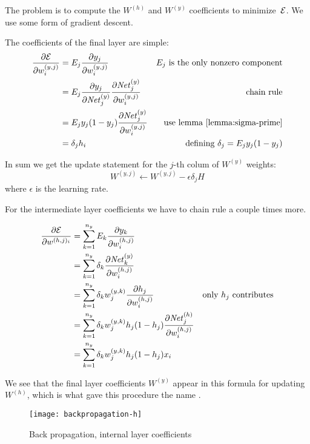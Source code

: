 The problem is to compute the $W^{(h)}$ and $W^{(y)}$ coefficients to
minimize~${\cal E}$. We use some form of gradient descent.

The coefficients of the final layer are simple:
\begin{align}
  \frac{\partial{\cal E}}{\partial w^{(y,j)}_i}
  &=E_j\frac{\partial y_j}{\partial w^{(y,j)}_i}
  &\hbox{$E_j$ is the only nonzero component}\\
  &=E_j \frac{\partial y_j}{\partial \mathord{\mathit{Net}}^{(y)}_j}
  \frac{\partial \mathord{\mathit{Net}}^{(y)}_j}{\partial w^{(y,j)}_i}
  &\hbox{chain rule}\\
  &=E_j y_j(1-y_j)
  \frac{\partial \mathord{\mathit{Net}}^{(y)}_j}{\partial w^{(y,j)}_i}
  &\hbox{use lemma~\ref{lemma:sigma-prime}}\\
  &=\delta_j h_i
  &\hbox{defining $\delta_j=E_jy_j(1-y_j)$}\\
\end{align}

In sum we get the update statement for the $j$-th colum of $W^{(y)}$
weights:
\[ W^{(y,j)} \leftarrow W^{(y,j)} - \epsilon \delta_j H \]
where $\epsilon$ is the learning rate.

For the intermediate layer coefficients we have to chain rule a couple
times more.

\begin{align}
  \frac{\partial{\cal E}}{\partial w^{(h,j)_i}}
  &=\sum_{k=1}^{n_y} E_k\frac{\partial y_k}{\partial w^{(h,j)}_i}\\
  &=\sum_{k=1}^{n_y} \delta_k\frac{\partial \mathord{\mathit{Net}}^{(y)}_k}{\partial w^{(h,j)}_i}\\
  &=\sum_{k=1}^{n_y} \delta_k w^{(y,k)}_j
  \frac{\partial h_j}{\partial w^{(h,j)}_i}
  &\hbox{only $h_j$ contributes}\\
  &=\sum_{k=1}^{n_y} \delta_k w^{(y,k)}_j h_j(1-h_j)
  \frac{\partial \mathord{\mathit{Net}}^{(h)}_j}{\partial w^{(h,j)}_i}\\
  &=\sum_{k=1}^{n_y} \delta_k w^{(y,k)}_j h_j(1-h_j) x_i\\
\end{align}

We see that the final layer coefficients $W^{(y)}$ appear in this
formula for updating~$W^{(h)}$, which
is what gave this procedure the name .

\begin{figure}[ht]
  \texttt{[image: backpropagation-h]}
  \caption{Back propagation, internal layer coefficients}
  \label{fig:backprop-h}
\end{figure}


